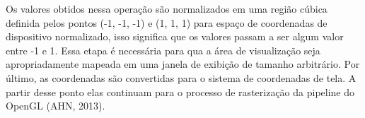 Os valores obtidos nessa operação são normalizados em uma região cúbica definida pelos pontos (-1, -1, -1) e (1, 1, 1) para espaço de coordenadas de dispositivo normalizado, isso significa que os valores passam a ser algum valor entre -1 e 1. Essa etapa é necessária para qua a área de visualização seja apropriadamente mapeada em uma janela de exibição de tamanho arbitrário. Por último, as coordenadas são convertidas para o sistema de coordenadas de tela. A partir desse ponto elas continuam para o processo de rasterização da pipeline do OpenGL (AHN, 2013)\nocite{openglOnline}. 
	\begin{figure}[h!]
		\centering
        \begin{subfigure}{0.45\textwidth}
        \end{subfigure}
		\hfill
        \begin{subfigure}{0.47\textwidth}
        \end{subfigure}
		{
		}
	\end{figure}


